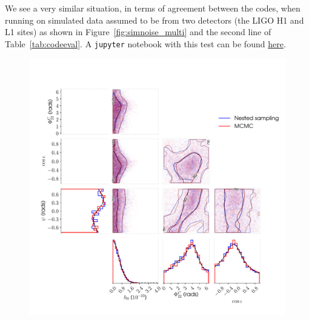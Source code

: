 We see a very similar situation, in terms of agreement between the codes, when running on simulated data assumed to be from two detectors (the LIGO
H1 and L1 sites) as shown in Figure~\ref{fig:simnoise_multi} and the second line of Table~\ref{tab:codeeval}. A {\tt jupyter} notebook with this test
can be found \href{https://github.com/mattpitkin/CW_nested_sampling_doc/blob/master/figures/codeeval/simulations/noise_multidet/SimulatedNoiseTestsMultidetPaper.ipynb}{here}.

\begin{figure}[!phtb]
\begin{center}
\includegraphics[width=1\columnwidth]{./figures/codeeval/simulations/noise_multidet/simulatednoisemultidettest}
\caption{ \protect}
\end{center}
\end{figure}

